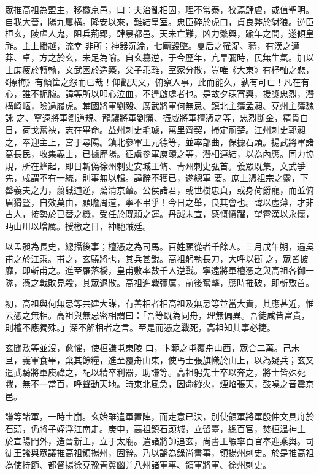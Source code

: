 \begin{pinyinscope}
 眾推高祖為盟主，移檄京邑，曰：夫治亂相因，理不常泰，狡焉肆虐，或值聖明。自我大晉，陽九屢構。隆安以來，難結皇室。忠臣碎於虎口，貞良弊於豺狼。逆臣桓玄，陵虐人鬼，阻兵荊郢，肆暴都邑。天未亡難，凶力繁興，踰年之間，遂傾皇祚。主上播越，流幸
 非所；神器沉淪，七廟毀墜。夏后之罹浞、豷，有漢之遭莽、卓，方之於玄，未足為喻。自玄篡逆，于今歷年，亢旱彌時，民無生氣。加以士庶疲於轉輸，文武困於造築，父子乖離，室家分散，豈唯《大東》有杼軸之悲，《摽梅》有傾筐之怨而已哉！仰觀天文，俯察人事，此而能久，孰有可亡！凡在有心，誰不扼腕。諱等所以叩心泣血，不遑啟處者也。是故夕寐宵興，援獎忠烈，潛構崎嶇，險過履虎。輔國將軍劉毅、廣武將軍何無忌、鎮北主簿孟昶、兗州主簿魏詠
 之、寧遠將軍劉道規、龍驤將軍劉籓、振威將軍檀憑之等，忠烈斷金，精貫白日，荷戈奮袂，志在畢命。益州刺史毛璩，萬里齊契，掃定荊楚。江州刺史郭昶之，奉迎主上，宮于尋陽。鎮北參軍王元德等，並率部曲，保據石頭。揚武將軍諸葛長民，收集義士，已據歷陽。征虜參軍庾賾之等，潛相連結，以為內應。同力協規，所在蜂起，即日斬偽徐州刺史安城王脩、青州刺史弘首。義眾既集，文武爭先，咸謂不有一統，則事無以輯。諱辭不獲已，遂總軍
 要。庶上憑祖宗之靈，下罄義夫之力，翦馘逋逆，蕩清京輦。公侯諸君，或世樹忠貞，或身荷爵寵，而並俯眉猾豎，自效莫由，顧瞻周道，寧不弔乎！今日之舉，良其會也。諱以虛薄，才非古人，接勢於已替之機，受任於既頹之運。丹誠未宣，感慨憤躍，望霄漢以永懷，眄山川以增厲。授檄之日，神馳賊廷。



 以孟昶為長史，總攝後事；檀憑之為司馬。百姓願從者千餘人。三月戊午朔，遇吳甫之於江乘。甫之，玄驍將也，其兵甚銳。高祖躬執長刀，大呼以衝
 之，眾皆披靡，即斬甫之。進至羅落橋，皇甫敷率數千人逆戰。寧遠將軍檀憑之與高祖各御一隊，憑之戰敗見殺，其眾退散。高祖進戰彌厲，前後奮擊，應時摧破，即斬敷首。



 初，高祖與何無忌等共建大謀，有善相者相高祖及無忌等並當大貴，其應甚近，惟云憑之無相。高祖與無忌密相謂曰：「吾等既為同舟，理無偏異。吾徒咸皆富貴，則檀不應獨殊。」深不解相者之言。至是而憑之戰死，高祖知其事必捷。



 玄聞敷等並沒，愈懼，使桓謙屯東陵
 口，卞範之屯覆舟山西，眾合二萬。己未旦，義軍食畢，棄其餘糧，進至覆舟山東，使丐士張旗幟於山上，以為疑兵；玄又遣武騎將軍庾禕之，配以精卒利器，助謙等。高祖躬先士卒以奔之，將士皆殊死戰，無不一當百，呼聲動天地。時東北風急，因命縱火，煙焰張天，鼓噪之音震京邑。



 謙等諸軍，一時土崩。玄始雖遣軍置陣，而走意已決，別使領軍將軍殷仲文具舟於石頭，仍將子姪浮江南走。庚申，高祖鎮石頭城，立留臺，總百官，焚桓溫神主
 於宣陽門外，造晉新主，立于太廟。遣諸將帥追玄，尚書王嘏率百官奉迎乘輿。司徒王謐與眾議推高祖領揚州，固辭。乃以謐為錄尚書事，領揚州刺史。於是推高祖為使持節、都督揚徐兗豫青冀幽并八州諸軍事、領軍將軍、徐州刺史。




\end{pinyinscope}
